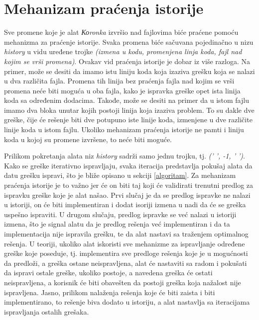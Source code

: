 \documentclass[12pt,oneside]{memoir}
\theoremstyle{plain}
\theoremstyle{definition}
\begin{document}
\section{Mehanizam praćenja istorije}\label{istorija}
Sve promene koje je alat \textit{Коronka} izvršio nad fajlovima biće praćene pomoću mehanizma za praćenje istorije. Svaka promena biće sačuvana pojedinačno u nizu \textit{history} u vidu uređene trojke \textit{(izmena u kodu, promenjena linja koda, fajl nad kojim se vrši promena)}. Ovakav vid praćenja istorije je dobar iz više razloga. Na primer, može se desiti da imamo istu liniju koda koja izaziva grešku koja se nalazi u dva različita fajla. Promena tih linija bez praćenja fajla nad kojim se vrši promena neće biti moguća u oba fajla, kako je ispravka greške opet ista linija koda sa određenim dodacima. Takođe, može se desiti na primer da u istom fajlu imamo dva bloka unutar kojih postoji linija koja izaziva problem. To su dakle dve greške, čije će rešenje biti dve potupuno iste linije koda, izmenjene u dve različite linije koda u istom fajlu. Ukoliko mehanizam praćenja istorije ne pamti i liniju koda u kojoj su promene izvršene, to neće biti moguće.  

Prilikom pokretanja alata niz \textit{history} sadrži samo jednu trojku, tj. \textit{(' ', -1, ' ')}. Kako se greške iterativno ispravljaju, svaka iteracija predstavlja pokušaj alata da datu grešku ispravi, što je bliže opisano u sekciji \ref{algoritam}. Za mehanizam praćenja istorije je to važno jer će on biti taj koji će validirati trenutni predlog za ispravku greške koje je alat našao. Prvi slučaj je da se predlog ispravke ne nalazi u istoriji, on će biti implementiran i dodat isoriji izmena u nadi da će se greška uspešno ispraviti. U drugom slučaju, predlog ispravke se već nalazi u istoriji izmena, što je signal alatu da je predlog rešenja već implementiran i da ta implementacija nije ispravila grešku, te da alat nastavi sa traženjem optimalnog rešenja. U teoriji, ukoliko alat iskoristi sve mehanizme za ispravljanje određene greške koje poseduje, tj. implementira sve predloge rešenja koje je u mogućnosti da predloži, a greška ostane neispravljena, alat će nastaviti sa radom i pokušati da ispravi ostale greške, ukoliko postoje, a navedena greška će ostati neispravljena, a korisnik će biti obavešten da postoji greška koja nažalost nije ispravljena. Jasno, prilikom nalaženja rešenja koje će biti zaista i biti implementirano, to rešenje biva dodato u istoriju, a alat nastavlja sa iteracijama ispravljanja ostalih grešaka.
\end{document}
